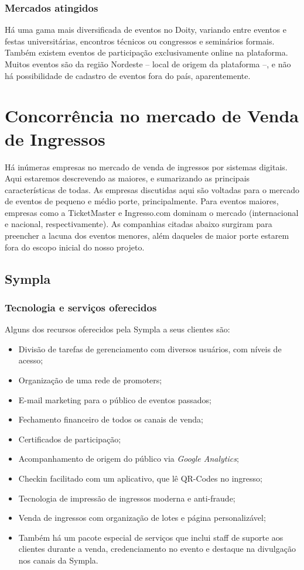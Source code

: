 \documentclass[12pt,a4paper,twoside,hyphens,english,brazil]{abntex2}
\begin{document}
\subsubsection*{Mercados atingidos}
Há uma gama mais diversificada de eventos no Doity, variando entre eventos e festas universitárias, encontros técnicos ou congressos e seminários formais. Também existem eventos de participação exclusivamente online na plataforma. Muitos eventos são da região Nordeste -- local de origem da plataforma --, e não há possibilidade de cadastro de eventos fora do país, aparentemente.

\section{Concorrência no mercado de Venda de Ingressos} \label{sec:sistemas:venda}
Há inúmeras empresas no mercado de venda de ingressos por sistemas digitais. Aqui estaremos descrevendo as maiores, e sumarizando as principais características de todas. As empresas discutidas aqui são voltadas para o mercado de eventos de pequeno e médio porte, principalmente. Para eventos maiores, empresas como a TicketMaster e Ingresso.com dominam o mercado (internacional e nacional, respectivamente). As companhias citadas abaixo surgiram para preencher a lacuna dos eventos menores, além daqueles de maior porte estarem fora do escopo inicial do nosso projeto.

\subsection{Sympla}

\subsubsection*{Tecnologia e serviços oferecidos}
Alguns dos recursos oferecidos pela Sympla a seus clientes são\cite{sympla-features}:
\begin{itemize}[itemsep=-1ex]
	\item Divisão de tarefas de gerenciamento com diversos usuários, com níveis de acesso;
	\item Organização de uma rede de promoters;
	\item E-mail marketing para o público de eventos passados;
	\item Fechamento financeiro de todos os canais de venda;
	\item Certificados de participação;
	\item Acompanhamento de origem do público via \emph{Google Analytics};
	\item Checkin facilitado com um aplicativo, que lê QR-Codes no ingresso;
	\item Tecnologia de impressão de ingressos moderna e anti-fraude;
	\item Venda de ingressos com organização de lotes e página personalizável;
	\item Também há um pacote especial de serviços que inclui staff de suporte aos clientes durante a venda, credenciamento no evento e destaque na divulgação nos canais da Sympla.
\end{itemize}
\end{document}
